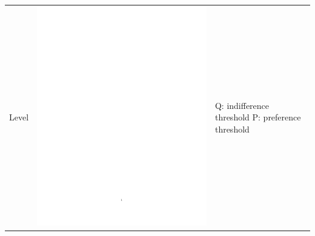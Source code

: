 \begin{enumerate}
\begin{table}[h!]
\begin{center}
\begin{tabular}{|l|c|b{4.2cm}|}
\hline Level & \includegraphics[page=2,trim=7.5cm 14cm 5cm 7cm,clip,scale=0.4]{prom_level_pdf} & Q: indifference threshold \newline P: preference threshold\\

\end{tabular}
\end{center}
\end{table}
\end{enumerate}
